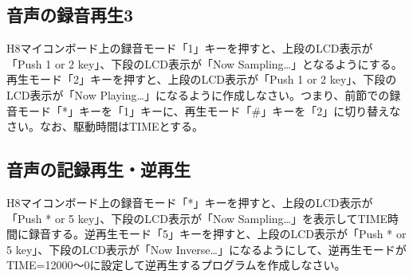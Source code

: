 \documentclass{jarticle}
\begin{document}
\subsection{音声の録音再生3}
H8マイコンボード上の録音モード「1」キーを押すと、上段のLCD表示が「Push 1 or 2 key」、下段のLCD表示が「Now Sampling…」となるようにする。再生モード「2」キーを押すと、上段のLCD表示が「Push 1 or 2 key」、下段のLCD表示が「Now Playing…」になるように作成しなさい。つまり、前節での録音モード「*」キーを「1」キーに、再生モード「#」キーを「2」に切り替えなさい。なお、駆動時間はTIMEとする。

\subsection{音声の記録再生・逆再生}
H8マイコンボード上の録音モード「*」キーを押すと、上段のLCD表示が「Push * or 5 key」、下段のLCD表示が「Now Sampling…」を表示してTIME時間に録音する。逆再生モード「5」キーを押すと、上段のLCD表示が「Push * or 5 key」、下段のLCD表示が「Now Inverse…」になるようにして、逆再生モードがTIME=12000～0に設定して逆再生するプログラムを作成しなさい。
\end{document}
